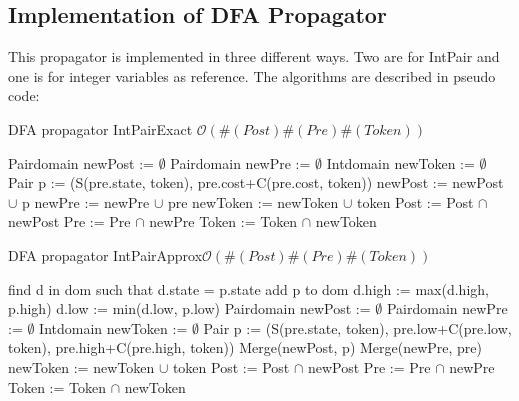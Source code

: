 \documentclass[a4paper,11pt]{article}
\begin{document}
\subsection{Implementation of DFA Propagator}
This propagator is implemented in three different ways. Two are for IntPair and one is for integer variables as reference. The algorithms are described in pseudo code:
\begin{algorithm}[H]
\caption{DFA propagator IntPairExact \newline $\mathcal{O}(\#(Post)\#(Pre)\#(Token))$}


\begin{algorithmic}[1]
\State Pairdomain newPost := $\emptyset$
\State Pairdomain newPre := $\emptyset$
\State Intdomain newToken := $\emptyset$
		\State Pair p := (S(pre.state, token), pre.cost+C(pre.cost, token))
			\State newPost := newPost $\cup$ p
			\State newPre := newPre $\cup$ pre
			\State newToken := newToken $\cup$ token 
		\EndIf
	\EndFor
\EndFor
\State Post := Post $\cap$ newPost
\State Pre := Pre $\cap$ newPre
\State Token := Token $\cap$ newToken
\EndProcedure
\end{algorithmic}
\end{algorithm}
\begin{algorithm}[H]
\caption{DFA propagator IntPairApprox\newline $\mathcal{O}(\#(Post)\#(Pre)\#(Token))$}
\begin{algorithmic}[1]
	\State find d in dom such that d.state = p.state
		\State add p to dom
	\Else	
		\State d.high := max(d.high, p.high)
		\State d.low := min(d.low, p.low)
	\EndIf
\EndProcedure
{}
\State Pairdomain newPost := $\emptyset$
\State Pairdomain newPre := $\emptyset$
\State Intdomain newToken := $\emptyset$
		\State Pair p := (S(pre.state, token), pre.low+C(pre.low, token), pre.high+C(pre.high, token))
			\State Merge(newPost, p)
			\State Merge(newPre, pre)
			\State newToken := newToken $\cup$ token 
		\EndIf
	\EndFor
\EndFor
\State Post := Post $\cap$ newPost
\State Pre := Pre $\cap$ newPre
\State Token := Token $\cap$ newToken
\EndProcedure
\end{algorithmic}
\end{algorithm}
\end{document}
